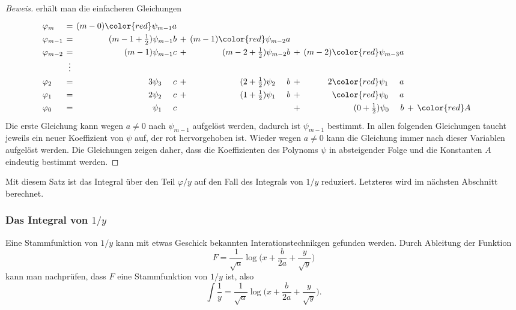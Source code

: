 \begin{proof}[Beweis]
erhält man die einfacheren Gleichungen
\begin{equation}
\renewcommand{\arraycolsep}{2pt}
\renewcommand{\arraystretch}{1.3}
\begin{array}{lcrcrcrcrcrcrcr}
\varphi_m
&=&
(m-0){\color{red}\psi_{m-1}}a & &     & & 
& &
\\
\varphi_{m-1}
&=&
(m-1+\frac12)\psi_{m-1}b
&+&
(m-1){\color{red}\psi_{m-2}}a
& &
& &
\\
\varphi_{m-2}
&=&
(m-1)\psi_{m-1}c
&+&
(m-2+\frac12)\psi_{m-2}b
&+&
(m-2){\color{red}\psi_{m-3}}a
& &
\\
&\vdots&&&&&&&&&&&
\\
\varphi_2
&=&
3\psi_{3\phantom{-m}}c
&+&
(2+\frac12)\psi_{2\phantom{-m}}b
&+&
2{\color{red}\psi_{1\phantom{-m}}}a
& &
\\
\varphi_1
&=&
2\psi_{2\phantom{-m}}c
&+&
(1+\frac12)\psi_{1\phantom{-m}}b
&+&
{\color{red}\psi_{0\phantom{-m}}}a
& &
\\
\varphi_0
&=&
\psi_{1\phantom{-m}}c
& &
&+&
(0+\frac12) \psi_{0\phantom{-m}}b
&+&{\color{red}A}
\end{array}
\end{equation}
Die erste Gleichung kann wegen $a\ne 0$ nach $\psi_{m-1}$ aufgelöst werden,
dadurch ist $\psi_{m-1}$ bestimmt.
In allen folgenden Gleichungen taucht jeweils ein neuer Koeffizient
von $\psi$ auf, der rot hervorgehoben ist.
Wieder wegen $a\ne 0$ kann die Gleichung immer nach dieser Variablen
aufgelöst werden.
Die Gleichungen zeigen daher, dass die Koeffizienten des Polynoms $\psi$
in absteigender Folge und die Konstanten $A$ eindeutig bestimmt werden.
\end{proof}

Mit diesem Satz ist das Integral über den Teil $\varphi/y$ auf den
Fall des Integrals von $1/y$ reduziert.
Letzteres wird im nächsten Abschnitt berechnet.

%
%
\subsubsection{Das Integral von $1/y$}
Eine Stammfunktion von $1/y$ kann mit etwas Geschick bekannten
Interationstechnikgen gefunden werden.
Durch Ableitung der Funktion
\[
F
=
\frac{1}{\sqrt{a}}\log\biggl(x+\frac{b}{2a}+\frac{y}{\sqrt{y}}\biggr)
\]
kann man nachprüfen, dass $F$ eine Stammfunktion von $1/y$ ist,
also
\begin{equation}
\int
\frac{1}{y}
=
\frac{1}{\sqrt{a}}\log\biggl(x+\frac{b}{2a}+\frac{y}{\sqrt{y}}\biggr).
\end{equation}

